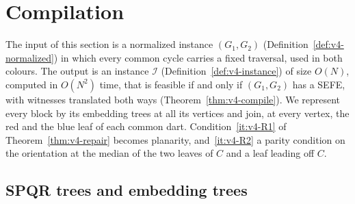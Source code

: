 \section{Compilation}\label{sec:v4-compile}

The input of this section is a normalized instance $(G_1,G_2)$
(Definition~\ref{def:v4-normalized}) in which every common cycle carries a
fixed traversal, used in both colours. The output is an instance $\mathcal I$
(Definition~\ref{def:v4-instance}) of size $O(N)$, computed in $O(N^2)$ time,
that is feasible if and only if $(G_1,G_2)$ has a SEFE, with witnesses
translated both ways (Theorem~\ref{thm:v4-compile}). We represent every block
by its embedding trees at all its vertices and join, at every vertex, the red
and the blue leaf of each common dart. Condition~\ref{it:v4-R1} of
Theorem~\ref{thm:v4-repair} becomes planarity, and~\ref{it:v4-R2} a parity
condition on the orientation at the median of the two leaves of $C$ and a
leaf leading off $C$.

\subsection{SPQR trees and embedding trees}\label{sec:v4-spqr}

